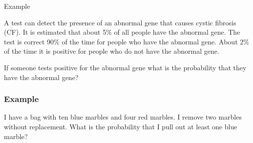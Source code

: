 \begin{frame}{Example}

  \vfill

  A test can detect the presence of an abnormal gene that causes cystic
  fibrosis (CF). It is estimated that about 5\% of all people have the
  abnormal gene. The test is correct 90\% of the time for people who
  have the abnormal gene. About 2\% of the time it is positive for
  people who do not have the abnormal gene.

  \vfill

  If someone tests positive for the abnormal gene what is the
  probability that they have the abnormal gene?

  \vfill
  
\end{frame}

\begin{frame}
  \frametitle{Example}

  I have a bag with ten blue marbles and four red marbles. I remove
  two marbles without replacement. What is the probability that I pull
  out at least one blue marble?


  \vfill

\end{frame}



